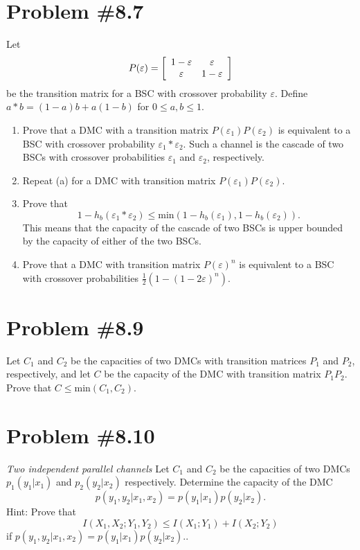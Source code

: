\documentclass{article}
\begin{document}
\section*{Problem \#8.7}
Let
$$
P(\varepsilon) = \left[\begin{array}{c c}
  1-\varepsilon & \varepsilon \\
  \varepsilon   & 1 - \varepsilon
\end{array}\right]
$$
be the transition matrix for a BSC with crossover probability $\varepsilon$.
Define $a \ast b = (1-a)b + a(1-b)$ for $0 \leq a, b \leq 1$.
\begin{enumerate}
  \item{Prove that a DMC with a transition matrix 
        $P(\varepsilon_1)P(\varepsilon_2)$ is equivalent to a BSC with
        crossover probability $\varepsilon_1 \ast \varepsilon_2$. Such a
        channel is the cascade of two BSCs with crossover probabilities
        $\varepsilon_1$ and $\varepsilon_2$, respectively.
       }
  \item{Repeat (a) for a DMC with transition matrix
        $P(\varepsilon_1)P(\varepsilon_2)$.
       }
  \item{Prove that
        $$
        1 - h_b(\varepsilon_1 \ast \varepsilon_2) 
          \leq \mathrm{min}(1 - h_b(\varepsilon_1), 1 - h_b(\varepsilon_2)).
        $$
        This means that the capacity of the cascade of two BSCs is upper
        bounded by the capacity of either of the two BSCs.
       }
  \item{Prove that a DMC with transition matrix $P(\varepsilon)^n$ is 
        equivalent to a BSC with crossover probabilities 
        $\frac{1}{2}(1 - (1 - 2\varepsilon)^n).$
       }
\end{enumerate}

\section*{Problem \#8.9}
Let $C_1$ and $C_2$ be the capacities of two DMCs with transition matrices
$P_1$ and $P_2$, respectively, and let $C$ be the capacity of the DMC with
transition matrix $P_1P_2$. Prove that $C \leq \mathrm{min}(C_1, C_2)$.

\section*{Problem \#8.10}
\textit{Two independent parallel channels} Let $C_1$ and $C_2$ be the 
capacities of two DMCs $p_1(y_1 | x_1)$ and $p_2(y_2 | x_2)$ respectively.
Determine the capacity of the DMC
$$
p(y_1, y_2 | x_1, x_2) = p(y_1 | x_1)p(y_2 | x_2).
$$
Hint: Prove that
$$
I(X_1, X_2 ; Y_1, Y_2) \leq I(X_1 ; Y_1) + I(X_2; Y_2)
$$
if $p(y_1, y_2 | x_1, x_2) = p(y_1 | x_1)p(y_2 | x_2).$.
\end{document}
